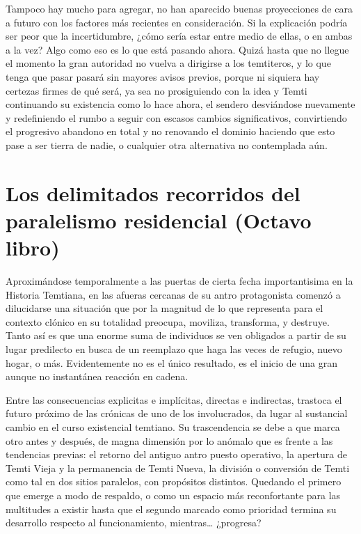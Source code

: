 \documentclass[
]{book}
\begin{document}
Tampoco hay mucho para agregar, no han aparecido buenas proyecciones de cara a futuro con los factores más recientes en consideración. Si la explicación podría ser peor que la incertidumbre, ¿cómo sería estar entre medio de ellas, o en ambas a la vez? Algo como eso es lo que está pasando ahora. Quizá hasta que no llegue el momento la gran autoridad no vuelva a dirigirse a los temtiteros, y lo que tenga que pasar pasará sin mayores avisos previos, porque ni siquiera hay certezas firmes de qué será, ya sea no prosiguiendo con la idea y Temti continuando su existencia como lo hace ahora, el sendero desviándose nuevamente y redefiniendo el rumbo a seguir con escasos cambios significativos, convirtiendo el progresivo abandono en total y no renovando el dominio haciendo que esto pase a ser tierra de nadie, o cualquier otra alternativa no contemplada aún.

\hypertarget{los-delimitados-recorridos-del-paralelismo-residencial-octavo-libro}{%
\chapter{Los delimitados recorridos del paralelismo residencial (Octavo libro)}\label{los-delimitados-recorridos-del-paralelismo-residencial-octavo-libro}}

Aproximándose temporalmente a las puertas de cierta fecha importantisima en la Historia Temtiana, en las afueras cercanas de su antro protagonista comenzó a dilucidarse una situación que por la magnitud de lo que representa para el contexto clónico en su totalidad preocupa, moviliza, transforma, y destruye. Tanto así es que una enorme suma de individuos se ven obligados a partir de su lugar predilecto en busca de un reemplazo que haga las veces de refugio, nuevo hogar, o más. Evidentemente no es el único resultado, es el inicio de una gran aunque no instantánea reacción en cadena.

Entre las consecuencias explicitas e implícitas, directas e indirectas, trastoca el futuro próximo de las crónicas de uno de los involucrados, da lugar al sustancial cambio en el curso existencial temtiano. Su trascendencia se debe a que marca otro antes y después, de magna dimensión por lo anómalo que es frente a las tendencias previas: el retorno del antiguo antro puesto operativo, la apertura de Temti Vieja y la permanencia de Temti Nueva, la división o conversión de Temti como tal en dos sitios paralelos, con propósitos distintos. Quedando el primero que emerge a modo de respaldo, o como un espacio más reconfortante para las multitudes a existir hasta que el segundo marcado como prioridad termina su desarrollo respecto al funcionamiento, mientras\ldots{} ¿progresa?
\end{document}
